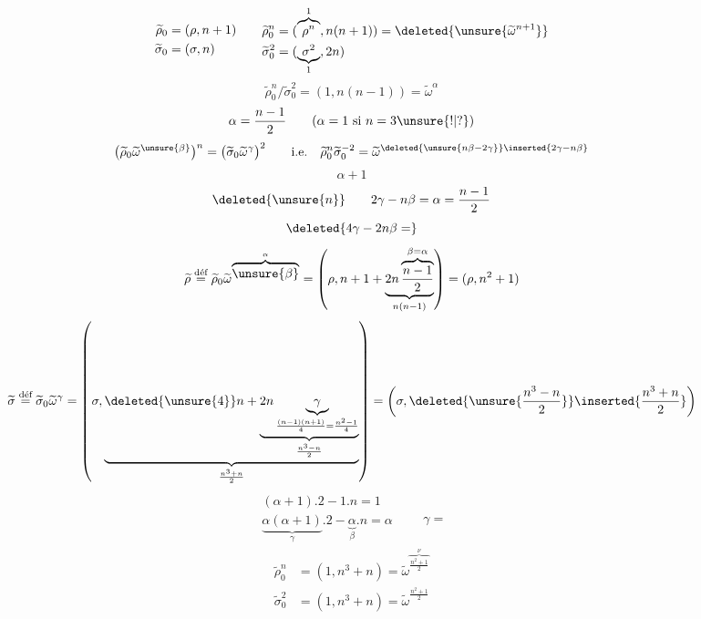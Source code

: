 \[
\begin{aligned}
\widetilde\rho_0&=(\rho,n+1)\\
\widetilde\sigma_0&=(\sigma,n)
\end{aligned}
\qquad
\begin{aligned}
\widetilde\rho_0^n&=(\overbrace{\rho^n}^{1},n(n+1))
 =\deleted{\unsure{\widetilde\omega^{n+1}}}\\
\widetilde\sigma_0^2&=(\underbrace{\sigma^2}_{1},2n)
\end{aligned}
\]
\[
\widetilde\rho_0^n/\widetilde\sigma_0^2
=(1,n(n-1))=\widetilde\omega^{\alpha}
\]
\[
\alpha=\frac{n-1}{2}\qquad
(\alpha=1\text{ si }n=3\unsure{!|?})
\]
\[
\bigl(\widetilde\rho_0\widetilde\omega^{\unsure{\beta}}\bigr)^n
=\bigl(\widetilde\sigma_0\widetilde\omega^{\gamma}\bigr)^2
\qquad\text{i.e.}\quad
\widetilde\rho_0^n\widetilde\sigma_0^{-2}
=\widetilde\omega^{\deleted{\unsure{n\beta-2\gamma}}\inserted{2\gamma-n\beta}}
\]
\[
\alpha+1
\]
\[
\deleted{\unsure{n}}\qquad
2\gamma-n\beta=\alpha=\frac{n-1}{2}
\]
\[
\deleted{4\gamma-2n\beta=}
\]
\[
\widetilde\rho\overset{\text{déf}}=
\widetilde\rho_0\widetilde\omega^{\overbrace{\unsure{\beta}}^{\alpha}}
=\left(\rho,n+1+
\underbrace{2n\overbrace{\frac{n-1}{2}}^{\beta=\alpha}}_{n(n-1)}\right)
=(\rho,n^2+1)
\]
\[
\widetilde\sigma\overset{\text{déf}}=
\widetilde\sigma_0\widetilde\omega^{\gamma}
=\left(\sigma,
\underbrace{
\deleted{\unsure{4}}n+
\underbrace{2n\underbrace{\gamma}_{\frac{(n-1)(n+1)}{4}=\frac{n^2-1}{4}}}
_{\frac{n^3-n}{2}}}_{\frac{n^3+n}{2}}
\right)
=\left(\sigma,\deleted{\unsure{\frac{n^3-n}{2}}}\inserted{\frac{n^3+n}{2}}\right)
\]
\[
\begin{array}{|l}
(\alpha+1).2-1.n=1\\
\underbrace{\alpha(\alpha+1)}_{\gamma}.2-
\underbrace{\alpha}_{\beta}.n=\alpha
\end{array}
\qquad\gamma=
\]
\margin{
\[
\begin{array}{|l}
\widetilde\rho=\widetilde\rho_0\widetilde\omega^{2x}\\
\widetilde\sigma=\widetilde\sigma_0\widetilde\omega^{nx}\\[1em]
x=
\end{array}
\]
}
\[
\begin{aligned}
\widetilde\rho_0^n&=(1,n^3+n)=
\widetilde\omega^{\overbrace{\frac{n^2+1}{2}}^{\nu}}\\
\widetilde\sigma_0^2&=(1,n^3+n)=\widetilde\omega^{\frac{n^2+1}{2}}
\end{aligned}
\]


